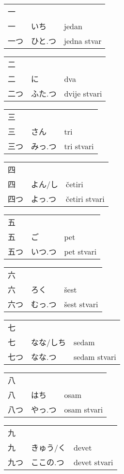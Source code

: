 

\newenvironment{dictentry}[1]{
	\begin{tabular}{p{2cm} p{3cm} p{10cm}}
		#1 &&\\
}{
	\end{tabular}
	\vspace{20pt}
}

\newcommand{\example}[3]{
	\hspace*{\fill}#1 & #2 & #3\\
}

\author{ロボット君}


\begin{dictentry}{一}
\example{一}{いち}{jedan}
\example{一つ}{ひと.つ}{jedna stvar}
\end{dictentry}

\begin{dictentry}{二}
\example{二}{に}{dva}
\example{二つ}{ふた.つ}{dvije stvari}
\end{dictentry}

\begin{dictentry}{三}
\example{三}{さん}{tri}
\example{三つ}{みっ.つ}{tri stvari}
\end{dictentry}

\begin{dictentry}{四}
\example{四}{よん/し}{četiri}
\example{四つ}{よっ.つ}{četiri stvari}
\end{dictentry}

\begin{dictentry}{五}
\example{五}{ご}{pet}
\example{五つ}{いつ.つ}{pet stvari}
\end{dictentry}

\begin{dictentry}{六}
\example{六}{ろく}{šest}
\example{六つ}{むっ.つ}{šest stvari}
\end{dictentry}

\begin{dictentry}{七}
\example{七}{なな/しち}{sedam}
\example{七つ}{なな.つ}{sedam stvari}
\end{dictentry}

\begin{dictentry}{八}
\example{八}{はち}{osam}
\example{八つ}{やっ.つ}{osam stvari}
\end{dictentry}

\begin{dictentry}{九}
\example{九}{きゅう/く}{devet}
\example{九つ}{ここの.つ}{devet stvari}
\end{dictentry}

